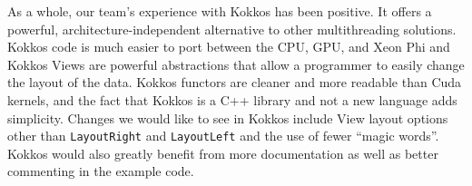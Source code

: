 As a whole, our team's experience with Kokkos has been positive.  It offers a
powerful, architecture-independent alternative to other multithreading
solutions.  Kokkos code is much easier to port between the CPU, GPU, and Xeon
Phi and Kokkos Views are powerful abstractions that allow a programmer to easily
change the layout of the data.  Kokkos functors are cleaner and more readable
than Cuda kernels, and the fact that Kokkos is a C++ library and not a new
language adds simplicity.  Changes we would like to see in Kokkos include View
layout options other than \texttt{LayoutRight} and \texttt{LayoutLeft} and the use of fewer
``magic words''.  Kokkos would also greatly benefit from more documentation as
well as better commenting in the example code.
